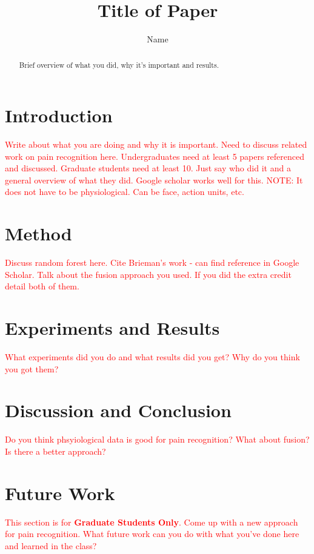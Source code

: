 \documentclass[conference]{IEEEtran}
\begin{document}
\title{Title of Paper}

\author{Name}

\maketitle

\begin{abstract}
Brief overview of what you did, why it's important and results.
\end{abstract}

\section{Introduction}
\textcolor{red}{Write about what you are doing and why it is important. Need to discuss related work on pain recognition here. Undergraduates need at least
5 papers referenced and discussed. Graduate students need at least 10. Just say who did it and a general overview of what they did. Google scholar works well for this.
NOTE: It does not have to be physiological. Can be face, action units, etc.}
\section{Method}
\textcolor{red}{Discuss random forest here. Cite Brieman's work - can find reference in Google Scholar. Talk about the fusion approach you used. If you did 
the extra credit detail both of them.}
\section{Experiments and Results}
\textcolor{red}{What experiments did you do and what results did you get? Why do you think you got them?}
\section{Discussion and Conclusion}
\textcolor{red}{Do you think phsyiological data is good for pain recognition? What about fusion? Is there a better approach?}
\section{Future Work}
\textcolor{red}{This section is for \textbf{Graduate Students Only}. Come up with a new approach for pain recognition. What future work can you do with what 
you've done here and learned in the class?}


\end{document}
